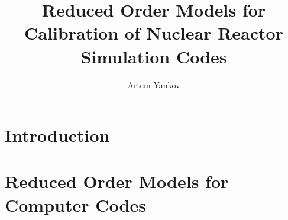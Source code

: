 \documentclass[thesis]{thesis-umich}
\title{Reduced Order Models for Calibration of Nuclear Reactor Simulation Codes}
\author{Artem Yankov}
\begin{document}
\chapter{Introduction}   \label{chap:intro}


\chapter{Reduced Order Models for Computer Codes} \label{chap:rom}




\end{document}
